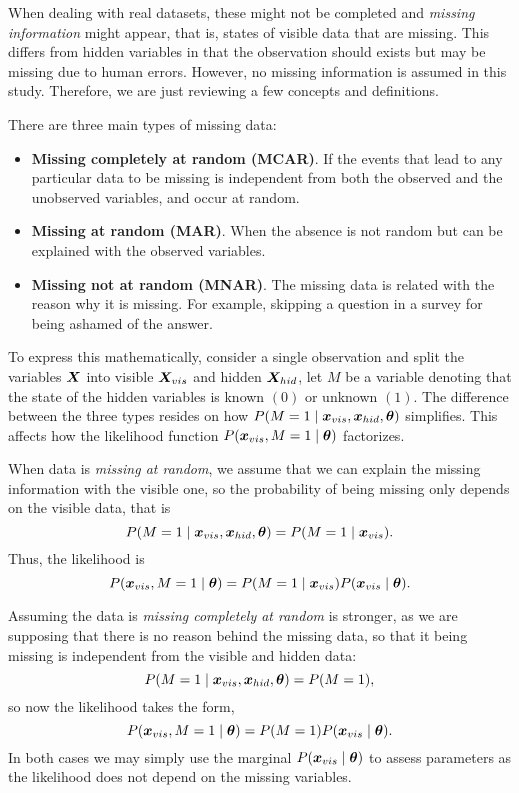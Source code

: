 
When dealing with real datasets, these might not be completed and \emph{missing information} might appear, that is, states of visible data that are missing. This differs from hidden variables in that the observation should exists but may be missing due to human errors. However, no missing information is assumed in this study. Therefore, we are just reviewing a few concepts and definitions.

There are three main types of missing data:
\begin{itemize}
  \item \textbf{Missing completely at random (MCAR)}. If the events that lead to any particular data to be missing is independent from both the observed and the unobserved variables, and occur at random.
  \item \textbf{Missing at random (MAR)}. When the absence is not random but can be explained with the observed variables.
  \item \textbf{Missing not at random (MNAR)}. The missing data is related with the reason why it is missing. For example, skipping a question in a survey for being ashamed of the answer.
\end{itemize}

To express this mathematically, consider a single observation and split the variables \(\bm{X}\) into visible \(\bm{X}_{vis}\) and hidden \(\bm{X}_{hid}\), let \(M\) be a variable denoting that the state of the hidden variables is known \((0)\) or unknown \((1)\). The difference between the three types resides on how \(P(M = 1 \mid \bm{x}_{vis}, \bm{x}_{hid}, \bm{\theta})\) simplifies. This affects how the likelihood function \(P(\bm{x}_{vis}, M=1 \mid \bm{\theta})\) factorizes.

When data is \emph{missing at random}, we assume that we can explain the missing information with the visible one, so the probability of being missing only depends on the visible data, that is
\[
  P(M = 1 \mid \bm{x}_{vis}, \bm{x}_{hid}, \bm{\theta}) = P(M = 1 \mid \bm{x}_{vis}).
\]
Thus, the likelihood is
\[
  P(\bm{x}_{vis}, M = 1 \mid \bm{\theta}) = P(M = 1 \mid \bm{x}_{vis})P(\bm{x}_{vis} \mid \bm{\theta}).
\]

Assuming the data is \emph{missing completely at random} is stronger, as we are supposing that there is no reason behind the missing data, so that it being missing is independent from the visible and hidden data:
\[
  P(M = 1 \mid \bm{x}_{vis}, \bm{x}_{hid}, \bm{\theta}) = P(M = 1),
\]
so now the likelihood takes the form,
\[
    P(\bm{x}_{vis}, M = 1 \mid \bm{\theta}) = P(M = 1)P(\bm{x}_{vis} \mid \bm{\theta}).
\]
In both cases we may simply use the marginal \(P(\bm{x}_{vis} \mid \bm{\theta})\) to assess parameters as the likelihood does not depend on the missing variables.

